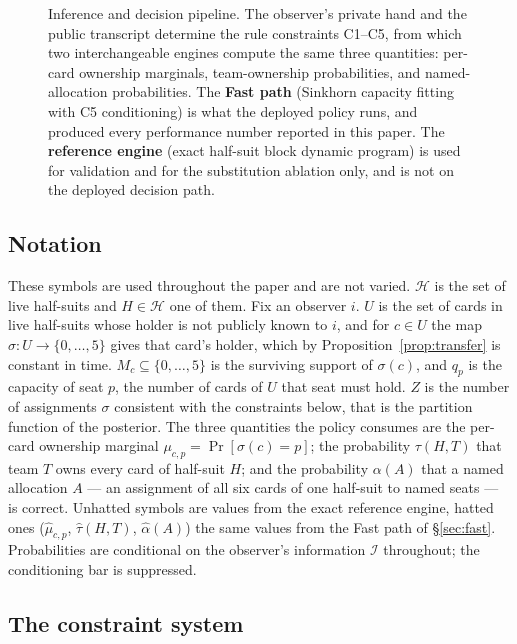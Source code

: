 \begin{figure}[ht]
\centering
\resizebox{\linewidth}{!}{}
\caption{Inference and decision pipeline. The observer's private hand and the
public transcript determine the rule constraints C1--C5, from which two
interchangeable engines compute the same three quantities: per-card ownership
marginals, team-ownership probabilities, and named-allocation probabilities. The
\textbf{Fast path} (Sinkhorn capacity fitting with C5 conditioning) is what the
deployed \vfast{} policy runs, and produced every performance number reported in
this paper. The \textbf{reference engine} (exact half-suit block dynamic program)
is used for validation and for the substitution ablation only, and is not on the
deployed decision path.}
\label{fig:architecture}
\end{figure}

\subsection{Notation}
\label{sec:notation}

These symbols are used throughout the paper and are not varied. $\mathcal{H}$
is the set of live half-suits and $H \in \mathcal{H}$ one of them. Fix an
observer $i$. $U$ is the set of cards in live half-suits whose holder is not
publicly known to $i$, and for $c \in U$ the map $\sigma : U \to
\{0,\dots,5\}$ gives that card's holder, which by
Proposition~\ref{prop:transfer} is constant in time. $M_c \subseteq
\{0,\dots,5\}$ is the surviving support of $\sigma(c)$, and $q_p$ is the
capacity of seat $p$, the number of cards of $U$ that seat must hold. $Z$ is
the number of assignments $\sigma$ consistent with the constraints below, that
is the partition function of the posterior. The three quantities the policy
consumes are the per-card ownership marginal $\mu_{c,p} = \Pr[\sigma(c) = p]$;
the probability $\tau(H,T)$ that team $T$ owns every card of half-suit $H$;
and the probability $\alpha(A)$ that a named allocation $A$ --- an assignment
of all six cards of one half-suit to named seats --- is correct. Unhatted
symbols are values from the exact reference engine, hatted ones
($\hat\mu_{c,p}$, $\hat\tau(H,T)$, $\hat\alpha(A)$) the same values from the
Fast path of \S\ref{sec:fast}. Probabilities are conditional on the observer's
information $\mathcal{I}$ throughout; the conditioning bar is suppressed.

\subsection{The constraint system}
\label{sec:constraints}

